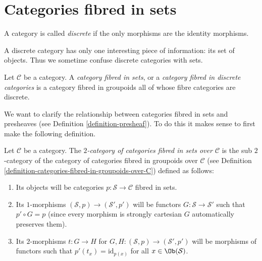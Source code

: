 \section{Categories fibred in sets}
\label{section-fibred-in-sets}

\begin{definition}
\label{definition-discrete}
A category is called {\it discrete} if the only morphisms are the identity
morphisms.
\end{definition}

\noindent
A discrete category has only one interesting piece of information:
its set of objects. Thus we sometime confuse discrete categories
with sets.

\begin{definition}
\label{definition-category-fibred-sets}
Let $\mathcal{C}$ be a category.
A {\it category fibred in sets}, or a {\it category fibred
in discrete categories} is a category fibred in groupoids all
of whose fibre categories are discrete.
\end{definition}

\noindent
We want to clarify the relationship between categories fibred in sets
and presheaves (see Definition \ref{definition-presheaf}).
To do this it makes sense to first make the following definition.

\begin{definition}
\label{definition-categories-fibred-in-sets-over-C}
Let $\mathcal{C}$ be a category.
The {\it $2$-category of categories fibred in sets over $\mathcal{C}$}
is the sub $2$-category of the category of categories fibred in groupoids
over $\mathcal{C}$ (see
Definition \ref{definition-categories-fibred-in-groupoids-over-C})
defined as follows:
\begin{enumerate}
\item Its objects will be categories
$p : \mathcal{S} \to \mathcal{C}$ fibred in sets.
\item Its $1$-morphisms $(\mathcal{S}, p) \to (\mathcal{S}', p')$
will be functors $G : \mathcal{S} \to \mathcal{S}'$ such that
$p' \circ G = p$ (since every morphism is strongly cartesian
$G$ automatically preserves them).
\item Its $2$-morphisms $t : G \to H$ for
$G, H : (\mathcal{S}, p) \to (\mathcal{S}', p')$
will be morphisms of functors
such that $p'(t_x) = \text{id}_{p(x)}$
for all $x \in \Ob(\mathcal{S})$.
\end{enumerate}
\end{definition}

